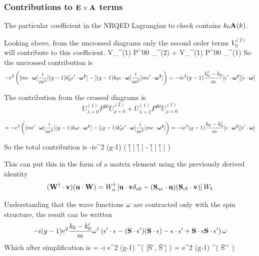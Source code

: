 \subsubsection{Contributions to $\mathbf{E} \times \mathbf{A}$ terms}
The particular coefficient in the NRQED Lagrangian to check contains $k_0 \mathbf{A}(k)$.

Looking above, from the uncrossed diagrams only the second order terms $V^{(2)}_0$ will contribute to this coefficient.
\beq
V_{}^{(1)} P^{00} _{}^{(2)} + V_{}^{(1)} P^{00} _{}^{(1)}	
\eeq
So the uncrossed contribution is
\[
- e^2 \left(  [m \mathbf{\epsilon} \cdot \mbox{\boldmath$ \omega $} ] \frac{i}{m^2} [(g-1)k'_0 \mathbf{\epsilon'} \cdot \mbox{\boldmath$ \omega^\dagger $} ] -  [ (g-1)k_0  \mathbf{\epsilon} \cdot \mbox{\boldmath$ \omega $} ]\frac{i}{m^2} [m \mathbf{\epsilon'} \cdot \mbox{\boldmath$ \omega^\dagger $}] \right )
	=
- i e^2 (g-1)\frac{ k'_0 - k_0}{m}  [\mathbf{\epsilon'} \cdot \mbox{\boldmath$ \omega^\dagger $}] [\mathbf{\epsilon} \cdot \mbox{\boldmath$ \omega $} ]
\]



The contribution from the crossed diagrams is
\[
U_{\lambda=0}^{(1)} P^{00} \overline{U}_{\rho=0}^{(2)} + U_{\lambda=2}^{(1)} P^{00} \overline{U}_{\rho=0}^{(1)}	
\]

\[
=- e^2 \left(  [m \mathbf{\epsilon'} \cdot \mbox{\boldmath$ \omega $} ] \frac{i}{m^2} [(g-1)k_0 \mathbf{\epsilon} \cdot \mbox{\boldmath$ \omega^\dagger $} ] -  [ (g-1)k'_0  \mathbf{\epsilon'} \cdot \mbox{\boldmath$ \omega $} ]\frac{i}{m^2} [m \mathbf{\epsilon} \cdot \mbox{\boldmath$ \omega^\dagger $}] \right )
	=
- i e^2 (g-1)\frac{ k_0 - k'_0}{m} [\mathbf{\epsilon} \cdot \mbox{\boldmath$ \omega^\dagger $}] [\mathbf{\epsilon'} \cdot \mbox{\boldmath$ \omega $} ]
\]

So the total contribution is
\beq 
	-ie^2 (g-1)  \left( [\v{\A} \cdot \gv{\W^\dagger}] [\v{\Adag} \cdot \gv{\W} ] -  [\v{\Adag} \cdot \gv{\W^\dagger}] [\v{\A} \cdot \gv{\W} ] \right )
\eeq



This can put this in the form of a matrix element using the previously derived identity
\[(\mathbf{W^\dagger} \cdot \mathbf{v} )( \mathbf{u} \cdot \mathbf{W} )= W^\dagger_a \left[ \mathbf{u} \cdot \mathbf{v} \delta_{ab} - (\mathbf{S}_{ac} \cdot \mathbf{u})(\mathbf{S}_{cb} \cdot \mathbf{v}) \right ] W_b\] 


Understanding that the wave functions $\omega$ are contracted only with the spin structure, the result can be written
\[
		  -i (g-1)e^2  \frac{ k_0 - k'_0}{m} \omega^\dagger \left( \mathbf{\epsilon'} \cdot \mathbf{\epsilon} - (\mathbf{S} \cdot \mathbf{\epsilon'}) (\mathbf{S} \cdot \mathbf{\epsilon})  -\mathbf{\epsilon} \cdot \mathbf{\epsilon'} + \mathbf{S} \cdot \mathbf{\epsilon} \mathbf{S} \cdot \mathbf{\epsilon'} \right ) \omega
\]
Which after simplification is
\beq \label{eq:S1:trees1}
\Mtrees = 	-i  e^2 (g-1)  \W^\dagger \left(  [\v{S} \cdot \v{\A}, \v{S} \cdot \v{\Adag}] \right ) \W
=
	e^2 (g-1)  \W^\dagger  \left( \v{S} \cdot \v{\A} \times \v{\Adag} \right ) \W
\eeq



